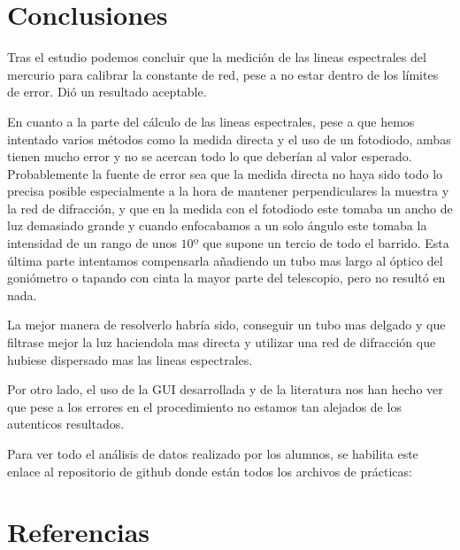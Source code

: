 \documentclass[11pt, a4paper, twocolumn]{article}
\begin{document}
\section{Conclusiones}

Tras el estudio podemos concluir que la medición de las lineas espectrales 
del mercurio para calibrar la constante de red, pese a no estar dentro de los 
límites de error. Dió un resultado aceptable.

\vspace{0.2cm}

En cuanto a la parte del cálculo de las lineas espectrales, pese a que hemos intentado 
varios métodos como la medida directa y el uso de un fotodiodo, ambas tienen 
mucho error y no se acercan todo lo que deberían al valor esperado. Probablemente 
la fuente de error sea que la medida directa no haya sido todo lo precisa posible 
especialmente a la hora de mantener perpendiculares la muestra y la red de difracción, 
y que en la medida con el fotodiodo este tomaba un ancho de luz demasiado grande 
y cuando enfocabamos a un solo ángulo este tomaba la intensidad de un rango de unos $10º$ 
que supone un tercio de todo el barrido. Esta última parte intentamos compensarla 
añadiendo un tubo mas largo al óptico del goniómetro o tapando con cinta la mayor 
parte del telescopio, pero no resultó en nada.

\vspace{0.2cm}

La mejor manera de resolverlo habría sido, conseguir un tubo mas delgado y que 
filtrase mejor la luz haciendola mas directa y utilizar una red de difracción 
que hubiese dispersado mas las lineas espectrales.

\vspace{0.2cm}

Por otro lado, el uso de la GUI desarrollada y de la literatura nos han hecho 
ver que pese a los errores en el procedimiento no estamos tan alejados de los 
autenticos resultados.

\vspace{1cm}
Para ver todo el análisis de datos realizado por los alumnos, se habilita este 
enlace al repositorio de 
github donde están todos los archivos de prácticas: 
\cite{experimental32026}


\section{Referencias}

\nocite{experimental32026}
\end{document}

